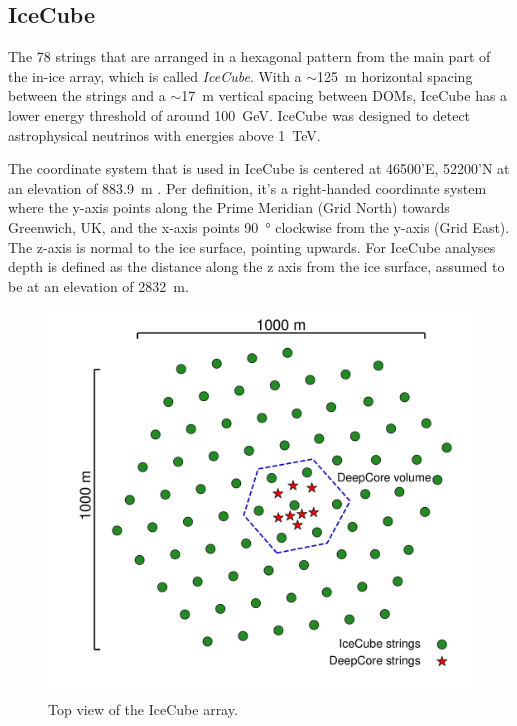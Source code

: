 \subsection{IceCube}

The 78 strings that are arranged in a hexagonal pattern from the main part of the in-ice array, which is called \textit{IceCube}. With a $\sim$\SI{125}{\metre} horizontal spacing between the strings and a $\sim$\SI{17}{\metre} vertical spacing between DOMs, IceCube has a lower energy threshold of around \SI{100}{GeV}. IceCube was designed to detect astrophysical neutrinos with energies above \SI{1}{\tera\electronvolt}.

The coordinate system that is used in IceCube is centered at 46500'E, 52200'N at an elevation of \SI{883.9}{\metre} . Per definition, it's a right-handed coordinate system where the y-axis points along the Prime Meridian (Grid North) towards Greenwich, UK, and the x-axis points \SI{90}{\degree} clockwise from the y-axis (Grid East). The z-axis is normal to the ice surface, pointing upwards. For IceCube analyses depth is defined as the distance along the z axis from the ice surface, assumed to be at an elevation of \SI{2832}{\metre}.



\begin{figure}
    \includegraphics[trim={2.0cm, 1.5cm, 0, 0}, clip, width=0.65\linewidth]{figures/icecube_deepcore/icecube_top_view_bw.pdf}
    \caption[IceCube top view]{Top view of the IceCube array.}
\end{figure}


